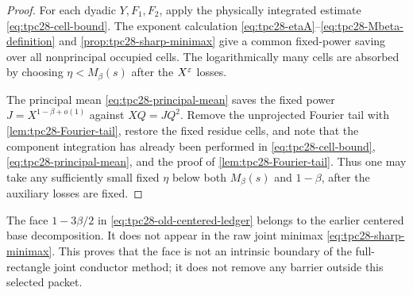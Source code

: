 \begin{proof}
For each dyadic $Y,F_1,F_2$, apply the physically integrated estimate
\eqref{eq:tpc28-cell-bound}.  The exponent calculation
\eqref{eq:tpc28-etaA}--\eqref{eq:tpc28-Mbeta-definition} and
\cref{prop:tpc28-sharp-minimax} give a common fixed-power saving over
all nonprincipal occupied cells.  The logarithmically many cells are
absorbed by choosing $\eta<M_\beta(s)$ after the $X^\varepsilon$ losses.

The principal mean \eqref{eq:tpc28-principal-mean} saves the fixed
power $J=X^{1-\beta+o(1)}$ against
$XQ=JQ^2$.  Remove the unprojected Fourier tail with
\cref{lem:tpc28-Fourier-tail}, restore the fixed residue cells, and
note that the component integration has already been performed in
\eqref{eq:tpc28-cell-bound}, \eqref{eq:tpc28-principal-mean}, and the
proof of \cref{lem:tpc28-Fourier-tail}.  Thus one may take any
sufficiently small fixed $\eta$ below both $M_\beta(s)$ and
$1-\beta$, after the auxiliary losses are fixed.
\end{proof}

\begin{remark}
\label{rem:tpc28-old-face}
The face $1-3\beta/2$ in
\eqref{eq:tpc28-old-centered-ledger} belongs to the earlier centered
base decomposition.  It does not appear in the raw joint minimax
\eqref{eq:tpc28-sharp-minimax}.  This proves that the face is not an
intrinsic boundary of the full-rectangle joint conductor method; it
does not remove any barrier outside this selected packet.
\end{remark}
